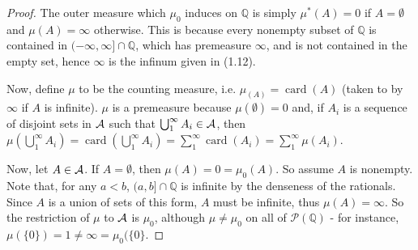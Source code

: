 \documentclass[10pt]{article}
\newcommand{\Q}{\mathbb{Q}}
\DeclareMathOperator*{\card}{card}
\renewcommand{\P}{\mathcal{P}}
\begin{document}
\begin{enumerate}
\begin{enumerate}
\begin{proof}
The outer measure which $\mu_0$ induces on $\Q$ is simply $\mu^*(A) = 0$ if $A = \emptyset$ and $\mu(A) = \infty$ otherwise.  This is because every nonempty subset of $\Q$ is contained in $(-\infty, \infty] \cap \Q$, which has premeasure $\infty$, and is not contained in the empty set, hence $\infty$ is the infinum given in (1.12).

Now, define $\mu$ to be the counting measure, i.e. $\mu_(A) = \card(A)$ (taken to by $\infty$ if $A$ is infinite).  $\mu$ is a premeasure because $\mu(\emptyset) = 0$ and, if $A_i$ is a sequence of disjoint sets in $\mathcal{A}$ such that $\bigcup_1^\infty A_i \in \mathcal{A}$, then $\mu(\bigcup_1^\infty A_i) = \card(\bigcup_1^\infty A_i) = \sum_1^\infty \card(A_i) = \sum_1^\infty \mu(A_i)$.

Now, let $A \in \mathcal{A}$.  If $A = \emptyset$, then $\mu(A) = 0 = \mu_0(A)$.  So assume $A$ is nonempty.  Note that, for any $a < b$, $(a,b] \cap \Q$ is infinite by the denseness of the rationals.  Since $A$ is a union of sets of this form, $A$ must be infinite, thus $\mu(A) = \infty$.  So the restriction of $\mu$ to $\mathcal{A}$ is $\mu_0$, although $\mu \neq \mu_0$ on all of $\P(\Q)$ - for instance, $\mu(\{0\}) = 1 \neq \infty = \mu_0(\{0\}$.
\end{proof}

\end{enumerate}

\end{enumerate}
\end{document}

